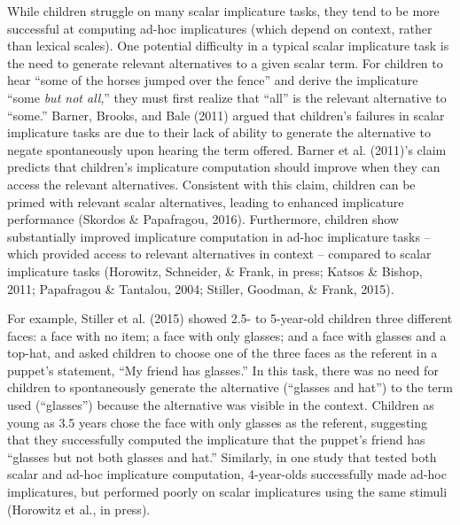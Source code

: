 \documentclass[man]{apa6}
\theoremstyle{definition}
\theoremstyle{definition}
\theoremstyle{definition}
\theoremstyle{remark}
\begin{document}
While children struggle on many scalar implicature tasks, they tend to
be more successful at computing ad-hoc implicatures (which depend on
context, rather than lexical scales). One potential difficulty in a
typical scalar implicature task is the need to generate relevant
alternatives to a given scalar term. For children to hear \enquote{some
of the horses jumped over the fence} and derive the implicature
\enquote{some \emph{but not all},} they must first realize that
\enquote{all} is the relevant alternative to \enquote{some.} Barner,
Brooks, and Bale (2011) argued that children's failures in scalar
implicature tasks are due to their lack of ability to generate the
alternative to negate spontaneously upon hearing the term offered.
Barner et al. (2011)'s claim predicts that children's implicature
computation should improve when they can access the relevant
alternatives. Consistent with this claim, children can be primed with
relevant scalar alternatives, leading to enhanced implicature
performance (Skordos \& Papafragou, 2016). Furthermore, children show
substantially improved implicature computation in ad-hoc implicature
tasks -- which provided access to relevant alternatives in context --
compared to scalar implicature tasks (Horowitz, Schneider, \& Frank, in
press; Katsos \& Bishop, 2011; Papafragou \& Tantalou, 2004; Stiller,
Goodman, \& Frank, 2015).

For example, Stiller et al. (2015) showed 2.5- to 5-year-old children
three different faces: a face with no item; a face with only glasses;
and a face with glasses and a top-hat, and asked children to choose one
of the three faces as the referent in a puppet's statement, \enquote{My
friend has glasses.} In this task, there was no need for children to
spontaneously generate the alternative (\enquote{glasses and hat}) to
the term used (\enquote{glasses}) because the alternative was visible in
the context. Children as young as 3.5 years chose the face with only
glasses as the referent, suggesting that they successfully computed the
implicature that the puppet's friend has \enquote{glasses but not both
glasses and hat.} Similarly, in one study that tested both scalar and
ad-hoc implicature computation, 4-year-olds successfully made ad-hoc
implicatures, but performed poorly on scalar implicatures using the same
stimuli (Horowitz et al., in press).
\end{document}
